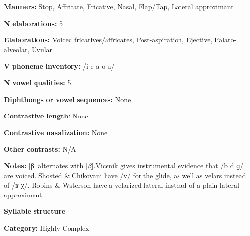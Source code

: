 \documentclass[output=paper]{langsci/langscibook}
\begin{document}
\begin{styleBody}
\textbf{Manners:} Stop, Affricate, Fricative, Nasal, Flap/Tap, Lateral approximant
\end{styleBody}

\begin{styleBody}
\textbf{N} \textbf{elaborations:} 5
\end{styleBody}

\begin{styleBody}
\textbf{Elaborations:} Voiced fricatives/affricates, Post-aspiration, Ejective, Palato-alveolar, Uvular
\end{styleBody}

\begin{styleBody}
\textbf{V} \textbf{phoneme} \textbf{inventory:} /i e a o u/
\end{styleBody}

\begin{styleBody}
\textbf{N} \textbf{vowel} \textbf{qualities:} 5
\end{styleBody}

\begin{styleBody}
\textbf{Diphthongs} \textbf{or} \textbf{vowel} \textbf{sequences:} None
\end{styleBody}

\begin{styleBody}
\textbf{Contrastive} \textbf{length:} None
\end{styleBody}

\begin{styleBody}
\textbf{Contrastive} \textbf{nasalization:} None
\end{styleBody}

\begin{styleBody}
\textbf{Other} \textbf{contrasts:} N/A
\end{styleBody}

\begin{styleBody}
\textbf{Notes:} [β] alternates with [$\beta ̞$].Vicenik gives instrumental evidence that /b d ɡ/ are voiced. Shosted \& Chikovani have /v/ for the glide, as well as velars instead of /ʁ χ/. Robins \& Waterson have a velarized lateral instead of a plain lateral approximant.
\end{styleBody}

\begin{styleBody}
\textbf{Syllable} \textbf{structure}
\end{styleBody}

\begin{styleBody}
\textbf{Category:} Highly Complex
\end{styleBody}
\end{document}
